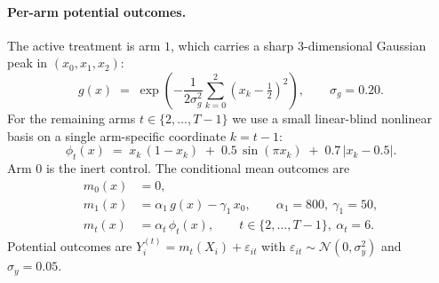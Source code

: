 \paragraph{Per-arm potential outcomes.}
The active treatment is arm $1$, which carries a sharp $3$-dimensional
Gaussian peak in $(x_{0},x_{1},x_{2})$:
\begin{equation}
  g(x) \;=\; \exp\!\left(
    -\frac{1}{2\sigma_g^{2}}
    \sum_{k=0}^{2}\left(x_{k}-\tfrac{1}{2}\right)^{2}
  \right),
  \qquad \sigma_g = 0.20.
\end{equation}
For the remaining arms $t \in \{2,\ldots,T-1\}$ we use a small
linear-blind nonlinear basis on a single arm-specific coordinate
$k = t - 1$:
\begin{equation}
  \phi_t(x) \;=\;
    x_{k}\,(1 - x_{k})
  \;+\; 0.5\,\sin(\pi x_{k})
  \;+\; 0.7\,|x_{k} - 0.5|.
\end{equation}
Arm $0$ is the inert control.  The conditional mean outcomes are
\begin{align}
  m_{0}(x)   &= 0, \\
  m_{1}(x)   &= \alpha_{1} \, g(x) - \gamma_{1}\, x_{0},
  \qquad \alpha_{1} = 800,\ \gamma_{1} = 50, \\
  m_{t}(x)   &= \alpha_{t}\, \phi_{t}(x),
  \qquad t \in \{2,\ldots,T-1\},\ \alpha_{t} = 6.
\end{align}
Potential outcomes are $Y^{(t)}_{i} = m_{t}(X_{i}) + \varepsilon_{it}$
with $\varepsilon_{it} \sim \mathcal{N}(0, \sigma_y^{2})$ and
$\sigma_y = 0.05$.

